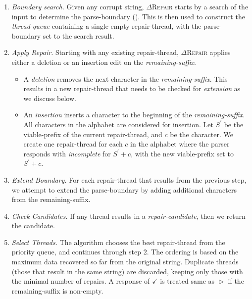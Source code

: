 \documentclass[sigconf,review,anonymous]{acmart}
\def\Rincomplete{\texttt{\color{incompletecolor}\textbf{$\vartriangleright$}}\xspace}
\def\Rvalid{\texttt{\color{validcolor}\textbf{$\checkmark$}}\xspace}
\newcommand{\approach}{\textsc{$\Delta$Repair}\xspace}
\newcommand{\drepair}{\approach}
\begin{document}
\begin{enumerate}[leftmargin=*]
\item \emph{Boundary search.} Given any corrupt string, \drepair starts by a
  search of the input to determine the parse-boundary ().
This is then used to construct the \emph{thread-queue} containing a single empty repair-thread,
with the parse-boundary set to the search result.

\item \emph{Apply Repair.} Starting with any existing repair-thread, \drepair applies
either a deletion or an insertion edit on the \emph{remaining-suffix}.
\begin{itemize}
\item A \emph{deletion} removes the next character in the \emph{remaining-suffix}.
This results in a new repair-thread that needs to be checked for \emph{extension} as we discuss below.
\item An \emph{insertion} inserts a character to the beginning of the \emph{remaining-suffix}.
All characters in the alphabet are considered for insertion.
Let $S^{'}$ be the viable-prefix of the current repair-thread, and $c$ be the character.
We create one repair-thread for each $c$ in the alphabet where the parser
responds with \emph{incomplete} for $S^{'}+c$, with the new viable-prefix set to $S^{'}+c$.
\end{itemize}
\item \emph{Extend Boundary.} For each repair-thread that results from the previous step,
we attempt to extend the parse-boundary by adding additional characters from the
remaining-suffix.
\item \emph{Check Candidates.} If any thread results in a
\emph{repair-candidate}, then we return the candidate.
\item \emph{Select Threads.} The algorithm chooses the best repair-thread from the priority queue,
and continues through step 2. The ordering is based on the maximum data recovered so far from the original string.
Duplicate threads (those that result in the same string) are discarded,
keeping only those with the minimal number of repairs. A response of \Rvalid is
treated same as \Rincomplete if the remaining-suffix is non-empty.
\end{enumerate}
\end{document}
